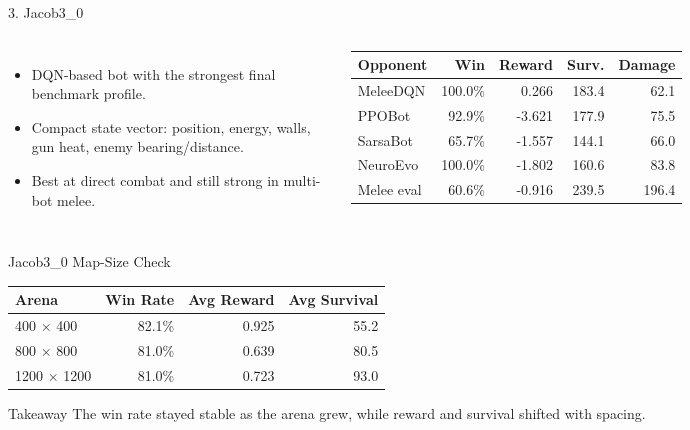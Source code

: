 \documentclass[12pt,aspectratio=169]{beamer}
\begin{document}
\begin{frame}{3. Jacob3\_0}
\small
\begin{columns}[T,totalwidth=\textwidth]
\begin{itemize}
  \item DQN-based bot with the strongest final benchmark profile.
  \item Compact state vector: position, energy, walls, gun heat, enemy bearing/distance.
  \item Best at direct combat and still strong in multi-bot melee.
\end{itemize}

\small
\begin{table}
\centering
\begin{tabular}{lrrrr}
\toprule
\textbf{Opponent} & \textbf{Win} & \textbf{Reward} & \textbf{Surv.} & \textbf{Damage} \\
\midrule
MeleeDQN & 100.0\% & 0.266 & 183.4 & 62.1 \\
PPOBot & 92.9\% & -3.621 & 177.9 & 75.5 \\
SarsaBot & 65.7\% & -1.557 & 144.1 & 66.0 \\
NeuroEvo & 100.0\% & -1.802 & 160.6 & 83.8 \\
Melee eval & 60.6\% & -0.916 & 239.5 & 196.4 \\
\bottomrule
\end{tabular}
\end{table}
\end{columns}
\end{frame}

\begin{frame}{Jacob3\_0 Map-Size Check}
\small
\begin{table}
\centering
\begin{tabular}{lrrr}
\toprule
\textbf{Arena} & \textbf{Win Rate} & \textbf{Avg Reward} & \textbf{Avg Survival} \\
\midrule
400 $\times$ 400 & 82.1\% & 0.925 & 55.2 \\
800 $\times$ 800 & 81.0\% & 0.639 & 80.5 \\
1200 $\times$ 1200 & 81.0\% & 0.723 & 93.0 \\
\bottomrule
\end{tabular}
\end{table}

\begin{block}{Takeaway}
The win rate stayed stable as the arena grew, while reward and survival shifted with spacing.
\end{block}
\end{frame}
\end{document}
